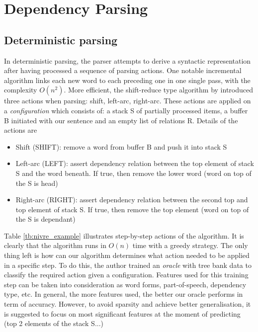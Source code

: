 \documentclass[12pt]{article}
\begin{document}
\section{Dependency Parsing} \label{dep_parsing}

\subsection{Deterministic parsing}
In deterministic parsing, the parser attempts to derive a syntactic representation after having processed a sequence of parsing actions. One notable incremental algorithm \cite{covington2001fundamental} links each new word to each preceding one in one single pass, with the complexity $O(n^2)$. More efficient, the shift-reduce type algorithm by \cite{nivre2003efficient} introduced three actions when parsing: shift, left-arc, right-arc. These actions are applied on a \textit{configuration} which consists of: a stack S of partially processed items, a buffer B initiated with our sentence and an empty list of relations R. Details of the actions are
\begin{itemize}
	\item Shift (SHIFT): remove a word from buffer B and push it into stack S
	\item Left-arc (LEFT): assert dependency relation between the top element of stack S and the word beneath. If true, then remove the lower word (word on top of the S is head)
	\item Right-arc (RIGHT): assert dependency relation between the second top and top element of stack S. If true, then remove the top element (word on top of the S is dependant)
\end{itemize}

Table \ref{tb:nivre_example} illustrates step-by-step actions of the algorithm. It is clearly that the algorithm runs in $O(n)$ time with a greedy strategy. The only thing left is how can our algorithm determines what action needed to be applied in a specific step. To do this, the author trained an \textit{oracle} with tree bank data to classify the required action given a configuration. Features used for this training step can be taken into consideration as word forms, part-of-speech, dependency type, etc. In general, the more features used, the better our oracle performs in term of accuracy. However, to avoid sparsity and achieve better generalisation, it is suggested to focus on most significant features at the moment of predicting (top 2 elements of the stack S...)
\end{document}
